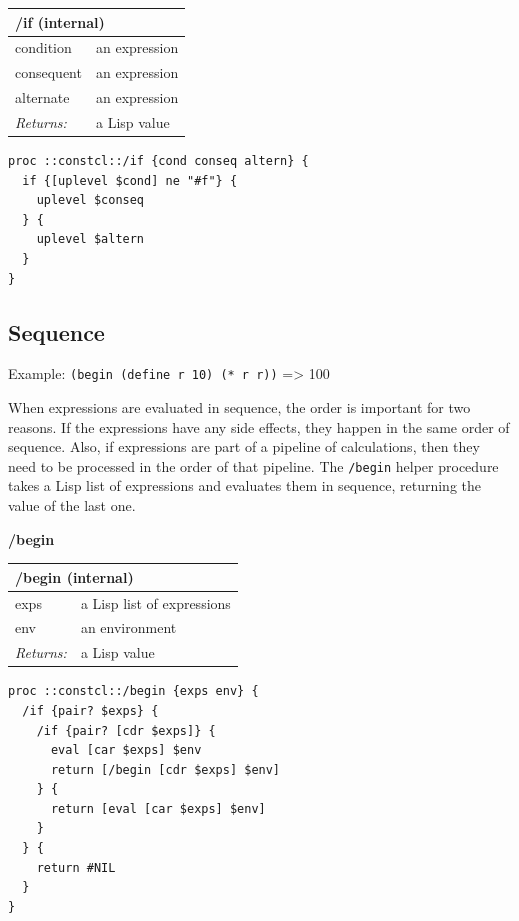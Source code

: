 \documentclass[twoside,9pt]{report}
\begin{document}
\begin{tabular}{ |l l| }
\hline
\multicolumn{2}{|l|}{/if (internal)} \\
\hline
condition & an expression \\
consequent & an expression \\
alternate & an expression \\
\textit{Returns:} & a Lisp value \\
\hline
\end{tabular}

\noindent\makebox[\linewidth]{\rule{\linewidth}{0.4pt}}
\begin{lstlisting}
proc ::constcl::/if {cond conseq altern} {
  if {[uplevel $cond] ne "#f"} {
    uplevel $conseq
  } {
    uplevel $altern
  }
}
\end{lstlisting}
\noindent\makebox[\linewidth]{\rule{\linewidth}{0.4pt}}
\subsection{Sequence}
\label{sequence}

Example: \texttt{(begin (define r 10) (* r r))} => 100


When expressions are evaluated in sequence, the order is important for two reasons. If the expressions have any side effects, they happen in the same order of sequence. Also, if expressions are part of a pipeline of calculations, then they need to be processed in the order of that pipeline. The \texttt{/begin} helper procedure takes a Lisp list of expressions and evaluates them in sequence, returning the value of the last one.


\textbf{/begin}

\begin{tabular}{ |l l| }
\hline
\multicolumn{2}{|l|}{/begin (internal)} \\
\hline
exps & a Lisp list of expressions \\
env & an environment \\
\textit{Returns:} & a Lisp value \\
\hline
\end{tabular}

\noindent\makebox[\linewidth]{\rule{\linewidth}{0.4pt}}
\begin{lstlisting}
proc ::constcl::/begin {exps env} {
  /if {pair? $exps} {
    /if {pair? [cdr $exps]} {
      eval [car $exps] $env
      return [/begin [cdr $exps] $env]
    } {
      return [eval [car $exps] $env]
    }
  } {
    return #NIL
  }
}
\end{lstlisting}
\noindent\makebox[\linewidth]{\rule{\linewidth}{0.4pt}}
\end{document}

